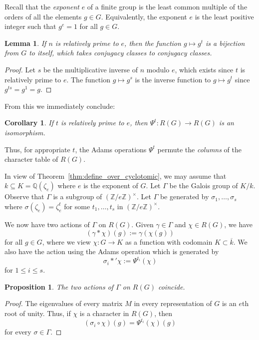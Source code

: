 \documentclass[12pt]{article}
\theoremstyle{plain}
\newtheorem{lemma}[theorem]{Lemma}
\newtheorem{proposition}[theorem]{Proposition}
\newtheorem{corollary}[theorem]{Corollary}
\theoremstyle{definition}
\theoremstyle{remark}
\numberwithin{equation}{section}
\begin{document}
Recall that the \emph{exponent} $e$ of a finite group is the least common multiple
of the orders of all the elements $g \in G$.
Equivalently, the exponent $e$ is the least positive integer such that
$g^e=1$ for all $g \in G$.

\begin{lemma}
If $n$ is relatively prime to $e$,
then the function $g \mapsto g^t$ is a bijection from $G$ to itself,
which takes conjugacy classes to conjugacy classes.
\end{lemma}

\begin{proof}
Let $s$ be the multiplicative inverse of $n$ modulo $e$,
which exists since $t$ is relatively prime to $e$.
The function $g \mapsto g^s$ is the inverse function to
$g \mapsto g^t$ since $g^{ts}=g^1=g$.
\end{proof}

From this we immediately conclude:

\begin{corollary}
If $t$ is relatively prime to $e$,
then $\Psi^t : R(G) \to R(G)$ is an isomorphism.
\end{corollary}

Thus, for appropriate $t$, the Adams operations $\Psi^t$
permute the \emph{columns} of the character table of $R(G)$.

In view of Theorem~\ref{thm:define_over_cyclotomic},
we may assume that $k \subseteq K=\mathbb{Q}(\zeta_e)$
where $e$ is the exponent of $G$.
Let $\Gamma$ be the Galois group of $K/k$.
Observe that $\Gamma$ is a subgroup of
$(\mathbb{Z}/e\mathbb{Z})^\times$.
Let $\Gamma$ be generated by $\sigma_1,\ldots,\sigma_s$
where $\sigma(\zeta_e)=\zeta_e^t$ for some $t_1,\ldots,t_s$ in
$(\mathbb{Z}/e\mathbb{Z})^\times$.

We now have two actions of $\Gamma$ on $R(G)$.
Given $\gamma \in \Gamma$ and $\chi \in R(G)$, we have
\[
(\gamma \ast \chi)(g) := \gamma(\chi(g)) 
\]
for all $g \in G$,
where we view $\chi: G \to K$ as a function with codomain $K \subset
\overline{k}$.
We also have the action using the Adams operation
which is generated by
\[
\sigma_i \ast' \chi := \Psi^{t_i}(\chi)
\]
for $1 \le i \le s$.

\begin{proposition}
The two actions of $\Gamma$ on $R(G)$ coincide.
\end{proposition} 

\begin{proof}
The eigenvalues of every matrix $M$ in every representation of $G$ is an
$e$th root of unity.
Thus, if $\chi$ is a character in $R(G)$, then
\[
(\sigma_i \circ \chi)(g) = \Psi^{t_i}(\chi)(g)
\] 
for every $\sigma \in \Gamma$.
\end{proof}
\end{document}
